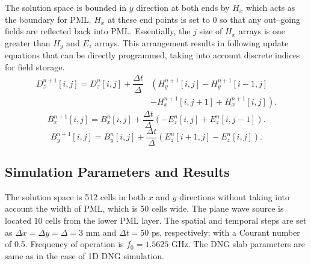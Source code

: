 The solution space is bounded in $y$ direction at both ends by $H_x$ which acts as the boundary for PML. $H_x$ at these end points is set to 0 so that any out--going fields are reflected back into PML. Essentially, the $j$ size of $H_x$ arrays is one greater than $H_y$ and $E_z$ arrays. This arrangement results in following update equations that can be directly programmed, taking into account discrete indices for field storage.
\begin{equation}
\begin{split}
D^{n+1}_z \left[i,j\right]=D^{n}_z \left[i,j\right]+\dfrac{\Delta t}{\Delta}&\left(H^{n+1}_y\left[i,j\right]-H^{n+1}_y \left[i-1,j\right]\right.\\
&\left.-H^{n+1}_x \left[i,j+1\right]+H^{n+1}_x \left[i,j\right]\right).
\end{split}
\label{eq:Dz-2D-FDTD-TMz-Corrected}
\end{equation}
\begin{equation}
B^{n+1}_x \left[i,j\right]=B^n_x \left[i,j\right] + \dfrac{\Delta t}{\Delta} \left(-E^{n}_z \left[i,j\right] + E^{n}_z \left[i,j-1\right] \right).
\label{eq:Bx-2D-FDTD-TMz-Corrected}
\end{equation}
\begin{equation}
B^{n+1}_y \left[i,j\right]=B^n_y \left[i,j\right] + \dfrac{\Delta t}{\Delta} \left( E^{n}_z \left[i+1,j\right] - E^{n}_z \left[i,j\right] \right).
\label{eq:By-2D-FDTD-TMz-Corrected}
\end{equation}
\subsection{Simulation Parameters and Results}
The solution space is 512 cells in both $x$ and $y$ directions without taking into account the width of PML, which is 50 cells wide. The plane wave source is located 10 cells from the lower PML layer. The spatial and temporal steps are set as $\Delta x=\Delta y=\Delta=3$ mm and $\Delta t=50$ ps, respectively; with a Courant number of 0.5. Frequency of operation is $f_0=1.5625$ GHz. The DNG slab parameters are same as in the case of 1D DNG simulation.

